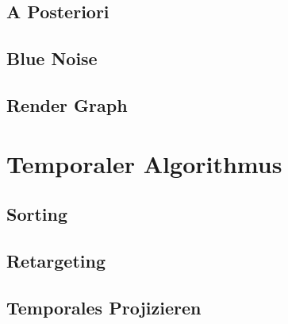 \newpage
\section{A Posteriori}
\label{ch:Content2:sec:a Posteriori}


\newpage
\section{Blue Noise}
\label{ch:Content1:sec:blue noise}



\newpage
\section{Render Graph}
\label{ch:Content2:sec:Render Graph}



\newpage
\chapter{Temporaler Algorithmus}
\label{ch:Temporaler Algorithmus}


\newpage
\section{Sorting}
\label{ch:Content2:sec:Sorting}


\newpage
\section{Retargeting}
\label{ch:Content2:sec:Retargeting}


\newpage
\section{Temporales Projizieren}
\label{ch:Content2:sec:Temporaler Ansatz}


